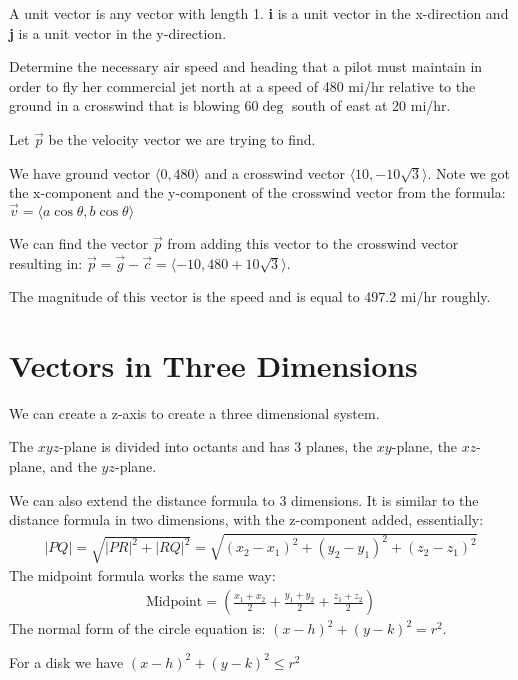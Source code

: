 \documentclass[../calc3.tex]{subfiles}
\begin{document}
A unit vector is any vector with length 1. \textbf{i} is a unit vector in the x-direction and \textbf{j} is a unit vector in the y-direction. 
\begin{example}
Determine the necessary air speed and heading that a pilot must maintain in order to fly her commercial jet north at a speed of 480 mi/hr relative to the ground in a crosswind that is blowing 60$\deg$ south of east at 20 mi/hr.

Let $\vec{p}$ be the velocity vector we are trying to find. 

We have ground vector $\langle0,480\rangle$ and a crosswind vector $\langle10,-10\sqrt{3}\rangle$. Note we got the x-component and the y-component of the crosswind vector from the formula: $\vec{v}=\langle a\cos\theta, b\cos\theta\rangle$

We can find the vector $\vec{p}$ from adding this vector to the crosswind vector resulting in: $\vec{p}=\vec{g}-\vec{c} = \langle-10,480+10\sqrt{3}\rangle$. 

The magnitude of this vector is the speed and is equal to 497.2 mi/hr roughly.
\end{example}
\section{Vectors in Three Dimensions}
We can create a z-axis to create a three dimensional system.

The $xyz$-plane is divided into octants and has 3 planes, the $xy$-plane, the $xz$-plane, and the $yz$-plane. 

We can also extend the distance formula to 3 dimensions. It is similar to the distance formula in two dimensions, with the z-component added, essentially:
\begin{align*}
|PQ|=\sqrt{|PR|^2+|RQ|^2}=\sqrt{(x_2-x_1)^2+(y_2-y_1)^2+(z_2-z_1)^2}
\end{align*}
The midpoint formula works the same way:
\begin{align*}
\text{Midpoint}=\left(\frac{x_1+x_2}{2}+\frac{y_1+y_2}{2}+\frac{z_1+z_2}{2}\right)
\end{align*}
The normal form of the circle equation is: $(x-h)^2+(y-k)^2=r^2$.

For a disk we have $(x-h)^2+(y-k)^2\leq r^2$
\end{document}
